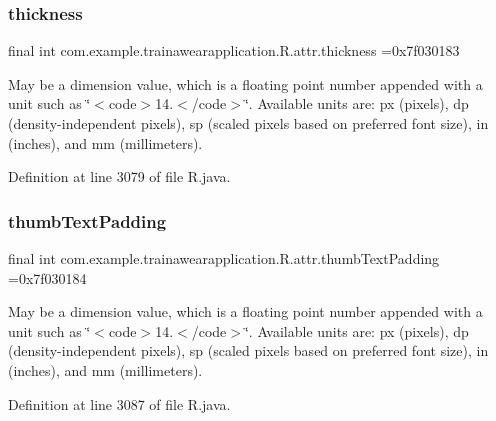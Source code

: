 \mbox{\label{classcom_1_1example_1_1trainawearapplication_1_1_r_1_1attr_ad56b25180f0ea533d8881feb0c5045fc}} 
\subsubsection{\texorpdfstring{thickness}{thickness}}
{\footnotesize\ttfamily final int com.\+example.\+trainawearapplication.\+R.\+attr.\+thickness =0x7f030183\hspace{0.3cm}{\ttfamily [static]}}

May be a dimension value, which is a floating point number appended with a unit such as \char`\"{}$<$code$>$14.\+5sp$<$/code$>$\char`\"{}. Available units are\+: px (pixels), dp (density-\/independent pixels), sp (scaled pixels based on preferred font size), in (inches), and mm (millimeters). 

Definition at line 3079 of file R.\+java.

\mbox{\label{classcom_1_1example_1_1trainawearapplication_1_1_r_1_1attr_adf7b05515dfb5928d2f150075c9201b5}} 
\subsubsection{\texorpdfstring{thumbTextPadding}{thumbTextPadding}}
{\footnotesize\ttfamily final int com.\+example.\+trainawearapplication.\+R.\+attr.\+thumb\+Text\+Padding =0x7f030184\hspace{0.3cm}{\ttfamily [static]}}

May be a dimension value, which is a floating point number appended with a unit such as \char`\"{}$<$code$>$14.\+5sp$<$/code$>$\char`\"{}. Available units are\+: px (pixels), dp (density-\/independent pixels), sp (scaled pixels based on preferred font size), in (inches), and mm (millimeters). 

Definition at line 3087 of file R.\+java.

